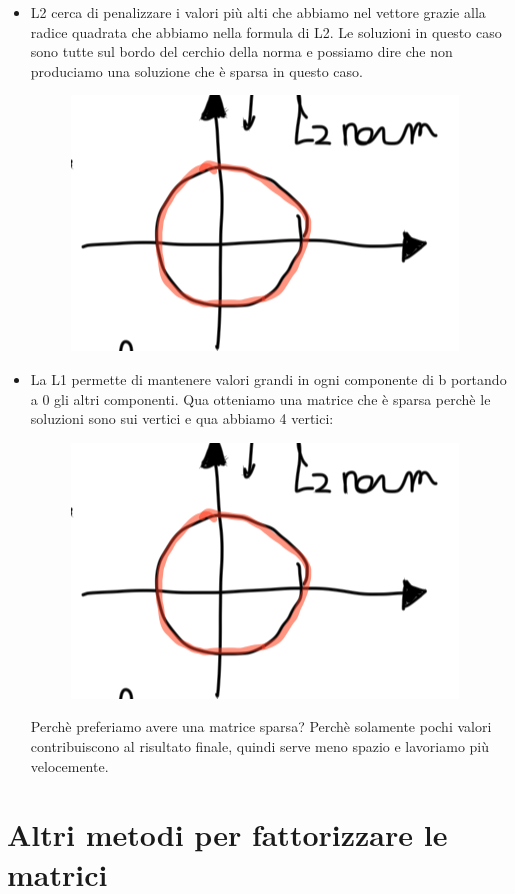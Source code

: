 \documentclass[14pt]{extreport}
\begin{document}
\begin{itemize}
	\item L2 cerca di penalizzare i valori più alti che abbiamo nel vettore grazie alla radice quadrata che abbiamo nella formula di L2. Le soluzioni
	      in questo caso sono tutte sul bordo del cerchio della norma e possiamo dire che non produciamo una soluzione che è sparsa in questo caso.
	      \begin{figure}[H]
		      \centering
		      \includegraphics[width=0.7\linewidth]{527.jpeg}
	      \end{figure}
	\item La L1 permette di mantenere valori grandi in ogni componente di b portando a 0 gli altri componenti. Qua otteniamo una matrice che è sparsa
	      perchè le soluzioni sono sui vertici e qua abbiamo 4 vertici:
	      \begin{figure}[H]
		      \centering
		      \includegraphics[width=0.7\linewidth]{527.jpeg}
	      \end{figure}
	      Perchè preferiamo avere una matrice sparsa? Perchè solamente pochi valori contribuiscono al risultato finale, quindi serve meno spazio e
	      lavoriamo più velocemente.
\end{itemize}

\section{Altri metodi per fattorizzare le matrici}
\end{document}

